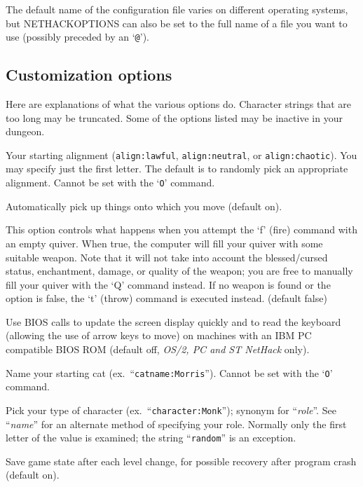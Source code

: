 The default name of the configuration file varies on different
operating systems, but NETHACKOPTIONS can also be set to
the full name of a file you want to use (possibly preceded by an `{\tt @}').

\subsection*{Customization options}

Here are explanations of what the various options do.
Character strings that are too long may be truncated.
Some of the options listed may be inactive in your dungeon.

\blist{}
\item[\ib{align}]
Your starting alignment ({\tt align:lawful}, {\tt align:neutral},
or {\tt align:chaotic}).  You may specify just the first letter.
The default is to randomly pick an appropriate alignment.
Cannot be set with the `{\tt O}' command.
\item[\ib{autopickup}]
Automatically pick up things onto which you move (default on).
\item[\ib{autoquiver}]
This option controls what happens when you attempt the `f' (fire)
command with an empty quiver.  When true, the computer will fill
your quiver with some suitable weapon.  Note that it will not take
into account the blessed/cursed status, enchantment, damage, or
quality of the weapon; you are free to manually fill your quiver with
the `Q' command instead.  If no weapon is found or the option is
false, the `t' (throw) command is executed instead.  (default false)
\item[\ib{BIOS}]
Use BIOS calls to update the screen display quickly and to read the keyboard
(allowing the use of arrow keys to move) on machines with an IBM PC
compatible BIOS ROM (default off, {\it OS/2, PC\/ {\rm and} ST NetHack\/} only).
\item[\ib{catname}]
Name your starting cat (ex.\ ``{\tt catname:Morris}'').
Cannot be set with the `{\tt O}' command.
\item[\ib{character}]
Pick your type of character (ex.\ ``{\tt character:Monk}'');
synonym for ``{\it role\/}''.  See ``{\it name\/}'' for an alternate method
of specifying your role.  Normally only the first letter of
the value is examined; the string ``{\tt random}'' is an exception.
\item[\ib{checkpoint}]
Save game state after each level change, for possible recovery after
program crash (default on).
